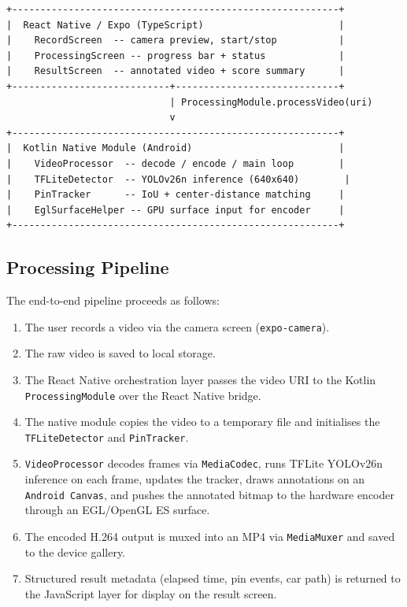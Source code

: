 \documentclass{zc-ust-hw}
\begin{document}
\begin{lstlisting}[language={}, basicstyle=\ttfamily\small, frame=single]
+----------------------------------------------------------+
|  React Native / Expo (TypeScript)                        |
|    RecordScreen  -- camera preview, start/stop           |
|    ProcessingScreen -- progress bar + status             |
|    ResultScreen  -- annotated video + score summary      |
+----------------------------+-----------------------------+
                             | ProcessingModule.processVideo(uri)
                             v
+----------------------------------------------------------+
|  Kotlin Native Module (Android)                          |
|    VideoProcessor  -- decode / encode / main loop        |
|    TFLiteDetector  -- YOLOv26n inference (640x640)        |
|    PinTracker      -- IoU + center-distance matching     |
|    EglSurfaceHelper -- GPU surface input for encoder     |
+----------------------------------------------------------+
\end{lstlisting}

\subsection{Processing Pipeline}

The end-to-end pipeline proceeds as follows:

\begin{enumerate}
    \item The user records a video via the camera screen (\texttt{expo-camera}).
    \item The raw video is saved to local storage.
    \item The React Native orchestration layer passes the video URI to the Kotlin \texttt{ProcessingModule} over the React Native bridge.
    \item The native module copies the video to a temporary file and initialises the \texttt{TFLiteDetector} and \texttt{PinTracker}.
    \item \texttt{VideoProcessor} decodes frames via \texttt{MediaCodec}, runs TFLite YOLOv26n inference on each frame, updates the tracker, draws annotations on an \texttt{Android Canvas}, and pushes the annotated bitmap to the hardware encoder through an EGL/OpenGL ES surface.
    \item The encoded H.264 output is muxed into an MP4 via \texttt{MediaMuxer} and saved to the device gallery.
    \item Structured result metadata (elapsed time, pin events, car path) is returned to the JavaScript layer for display on the result screen.
\end{enumerate}
\end{document}
